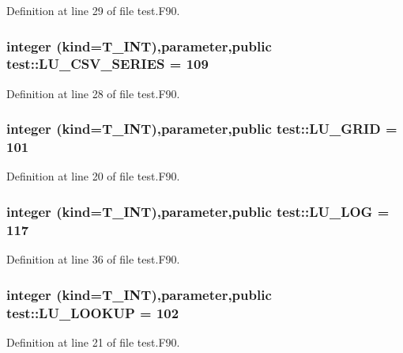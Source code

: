 Definition at line 29 of file test.F90.

\hypertarget{namespacetest_aaf67717999e2b4cc413c0fe565f31c80}{
\subsubsection[{LU\_\-CSV\_\-SERIES}]{\setlength{\rightskip}{0pt plus 5cm}integer (kind={\bf T\_\-INT}),parameter,public {\bf test::LU\_\-CSV\_\-SERIES} = 109}}
\label{namespacetest_aaf67717999e2b4cc413c0fe565f31c80}


Definition at line 28 of file test.F90.

\hypertarget{namespacetest_a5255cf8d0506fee4cf94c76d1bcb541d}{
\subsubsection[{LU\_\-GRID}]{\setlength{\rightskip}{0pt plus 5cm}integer (kind={\bf T\_\-INT}),parameter,public {\bf test::LU\_\-GRID} = 101}}
\label{namespacetest_a5255cf8d0506fee4cf94c76d1bcb541d}


Definition at line 20 of file test.F90.

\hypertarget{namespacetest_a6f591abb1742ac7c55e5146938c8d81f}{
\subsubsection[{LU\_\-LOG}]{\setlength{\rightskip}{0pt plus 5cm}integer (kind={\bf T\_\-INT}),parameter,public {\bf test::LU\_\-LOG} = 117}}
\label{namespacetest_a6f591abb1742ac7c55e5146938c8d81f}


Definition at line 36 of file test.F90.

\hypertarget{namespacetest_a269ea2c4032752326f4745d24712c02f}{
\subsubsection[{LU\_\-LOOKUP}]{\setlength{\rightskip}{0pt plus 5cm}integer (kind={\bf T\_\-INT}),parameter,public {\bf test::LU\_\-LOOKUP} = 102}}
\label{namespacetest_a269ea2c4032752326f4745d24712c02f}


Definition at line 21 of file test.F90.


